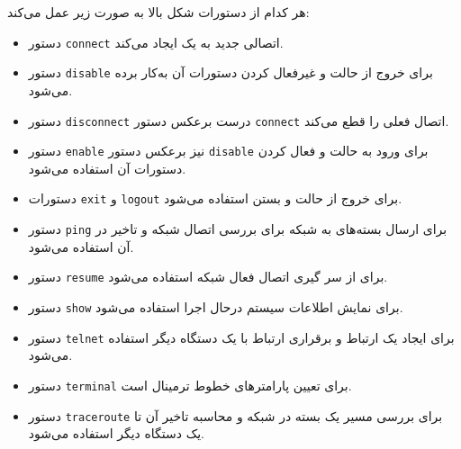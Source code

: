 \documentclass{article}
\newcommand{\code}[1]{\colorbox{codegray}{\texttt{#1}}}
\begin{document}
هر کدام از دستورات شکل بالا به صورت زیر عمل می‌کند:
\begin{itemize}
	\item 
	دستور \code{connect} اتصالی جدید به یک  ایجاد می‌کند.
	\item 
	دستور \code{disable} برای خروج از حالت  و غیرفعال کردن دستورات آن به‌کار برده می‌شود.
	\item 
	دستور \code{disconnect} درست برعکس دستور \code{connect} اتصال فعلی را قطع می‌کند.
	\item 
	دستور \code{enable} نیز برعکس دستور \code{disable} برای ورود به حالت  و فعال کردن دستورات آن استفاده می‌شود.
	\item 
	دستورات \code{exit}  و \code{logout} برای خروج از حالت  و بستن  استفاده می‌شود.
	\item 
	دستور \code{ping} برای ارسال بسته‌های  به شبکه برای بررسی اتصال شبکه و تاخیر در آن استفاده می‌شود.
	\item 
	دستور \code{resume} برای از سر گیری اتصال فعال شبکه استفاده می‌شود.
	\item 
	دستور \code{show} برای نمایش اطلاعات سیستم درحال اجرا استفاده می‌شود.
	\item 
	دستور \code{telnet} برای ایجاد یک ارتباط  و برقراری ارتباط با یک دستگاه دیگر استفاده می‌شود.
	\item 
	دستور \code{terminal} برای تعیین پارامترهای خطوط ترمینال است.
	\item 
	دستور \code{traceroute} برای بررسی مسیر یک بسته در شبکه و محاسبه تاخیر آن تا یک دستگاه دیگر استفاده می‌شود.
\end{itemize}
\end{document}
